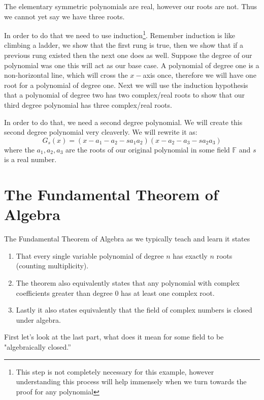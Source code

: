 \documentclass[12pt]{article}
\begin{document}
The elementary symmetric polynomials are real, however our roots are not.  Thus we cannot yet say we have three roots.

In order to do that we need to use induction\footnote{This step is not completely necessary for this example, however understanding this process will help immensely when we turn towards the proof for any polynomial}.    Remember induction is like climbing a ladder, we show that the first rung is true, then we show that if a previous rung existed then the next one does as well.  Suppose the degree of our polynomial was one this will act as our base case.  A polynomial of degree one is a non-horizontal line, which will cross the $x-$axis once, therefore we will have one root for a polynomial of degree one.  Next we will use the induction hypothesis that a polynomial of degree two has two complex/real roots to show that our third degree polynomial has three complex/real roots.

In order to do that, we need a second degree polynomial.  We will create this second degree polynomial very cleaverly.  We will rewrite it as:
$$G_s(x) = (x - a_1 - a_2 - sa_1a_2)(x - a_2 - a_3 - sa_2a_3)$$
where the $a_1, a_2, a_3$ are the roots of our original polynomial in some field $\mathbb{F}$ and $s$ is a real number.





\section*{The Fundamental Theorem of Algebra}
The Fundamental Theorem of Algebra as we typically teach and learn it states 
\begin{enumerate}
\item That every single variable polynomial of degree $n$ has exactly $n$ roots (counting multiplicity).
\item The theorem also equivalently states that any polynomial with complex coefficients greater than degree 0 has at least one complex root.  
\item Lastly it also states equivalently that the field of complex numbers is closed under algebra.
\end{enumerate}

First let's look at the last part, what does it mean for some field to be "algebraically closed.''
\end{document}
